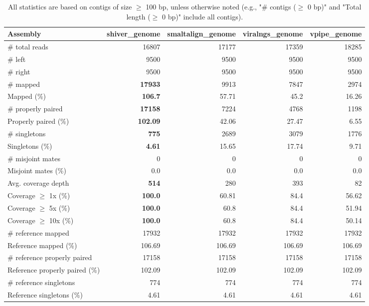 \documentclass[12pt,a4paper]{article}
\begin{document}
\begin{table}[ht]
\begin{center}
\caption{All statistics are based on contigs of size $\geq$ 100 bp, unless otherwise noted (e.g., "\# contigs ($\geq$ 0 bp)" and "Total length ($\geq$ 0 bp)" include all contigs).}
\begin{tabular}{|l*{4}{|r}|}
\hline
Assembly & shiver\_genome & smaltalign\_genome & viralngs\_genome & vpipe\_genome \\ \hline
\# total reads & 16807 & 17177 & 17359 & 18285 \\ \hline
\# left & 9500 & 9500 & 9500 & 9500 \\ \hline
\# right & 9500 & 9500 & 9500 & 9500 \\ \hline
\# mapped & {\bf 17933} & 9913 & 7847 & 2974 \\ \hline
Mapped (\%) & {\bf 106.7} & 57.71 & 45.2 & 16.26 \\ \hline
\# properly paired & {\bf 17158} & 7224 & 4768 & 1198 \\ \hline
Properly paired (\%) & {\bf 102.09} & 42.06 & 27.47 & 6.55 \\ \hline
\# singletons & {\bf 775} & 2689 & 3079 & 1776 \\ \hline
Singletons (\%) & {\bf 4.61} & 15.65 & 17.74 & 9.71 \\ \hline
\# misjoint mates & 0 & 0 & 0 & 0 \\ \hline
Misjoint mates (\%) & 0.0 & 0.0 & 0.0 & 0.0 \\ \hline
Avg. coverage depth & {\bf 514} & 280 & 393 & 82 \\ \hline
Coverage $\geq$ 1x (\%) & {\bf 100.0} & 60.81 & 84.4 & 56.62 \\ \hline
Coverage $\geq$ 5x (\%) & {\bf 100.0} & 60.8 & 84.4 & 51.94 \\ \hline
Coverage $\geq$ 10x (\%) & {\bf 100.0} & 60.8 & 84.4 & 50.14 \\ \hline
\# reference mapped & 17932 & 17932 & 17932 & 17932 \\ \hline
Reference mapped (\%) & 106.69 & 106.69 & 106.69 & 106.69 \\ \hline
\# reference properly paired & 17158 & 17158 & 17158 & 17158 \\ \hline
Reference properly paired (\%) & 102.09 & 102.09 & 102.09 & 102.09 \\ \hline
\# reference singletons & 774 & 774 & 774 & 774 \\ \hline
Reference singletons (\%) & 4.61 & 4.61 & 4.61 & 4.61 \\ \hline

\end{tabular}
\end{center}
\end{table}
\end{document}
